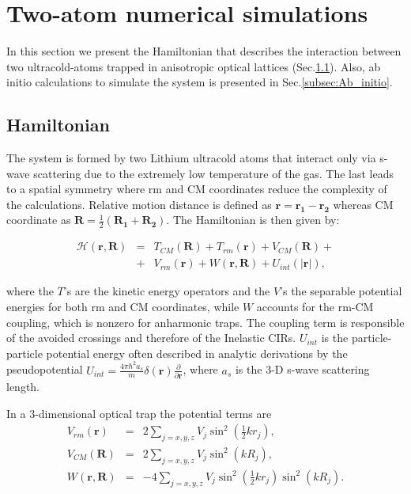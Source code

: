 \documentclass[aps,pre,twocolumn,superscriptaddress,showpacs]{revtex4-1}
\newcommand{\bfeq}[1]{{\boldsymbol{#1}}}
\begin{document}
\section{Two-atom numerical simulations}  \label{sec:system}
	In this section we present the Hamiltonian that describes the interaction between two ultracold-atoms trapped in anisotropic optical lattices (Sec.\ref{subsec:H}). Also, ab initio 	calculations to simulate the system is presented in Sec.\ref{subsec:Ab_initio}.
	\subsection{Hamiltonian} \label{subsec:H}
		The system is formed by two Lithium ultracold atoms that interact only via s-wave scattering due to the extremely low temperature of the gas. The 		last 	leads to a spatial symmetry where rm and CM coordinates reduce the complexity of the calculations. Relative motion distance is defined as		$\bfeq{r} = \bfeq{r_1} - \bfeq{r_2}$ whereas CM coordinate as $\bfeq{R} = \frac{1}{2}(\bfeq{R_1} + \bfeq{R_2})$. The Hamiltonian is then given 			by:
		
		\begin{eqnarray}
			\mathcal{H}(\bfeq{r}, \bfeq{R}) &=& T_{CM}(\bfeq{R}) + T_{rm}(\bfeq{r}) + V_{CM}(\bfeq{R}) + 				\nonumber \\ 
			 &+& V_{rm}(\bfeq{r}) + W(\bfeq{r}, \bfeq{R}) + U_{int}(|\bfeq{r}|), 
			 \label{eq:Hamiltonian}
		\end{eqnarray}
		
		where the $T$'s are the kinetic energy operators and the $V$'s the separable potential energies for both rm and CM coordinates, while $W$ 		accounts for the rm-CM coupling, which is nonzero for anharmonic traps. The coupling term is responsible of 			the avoided crossings and therefore of the Inelastic CIRs. $U_{int}$ is the particle-particle potential energy often described in analytic derivations by 		the pseudopotential $U_{int} = \frac{4\pi \hbar^2 a_s}{m} \delta(\bfeq{r})\frac{\partial}{\partial \bfeq{r}}$, where $a_s$ is the 3-D s-wave scattering length.
		
		In a 3-dimensional optical trap the potential terms are
		\begin{eqnarray}
			V_{rm}(\bfeq{r}) &=& 2 \sum_{j=x,y,z} V_j \sin^2 \left(\frac{1}{2}k r_j \right), \\
			V_{CM}(\bfeq{R}) &=& 2 \sum_{j=x,y,z} V_j \sin^2 \left(k R_j \right), \\
			W(\bfeq{r}, \bfeq{R}) &=& -4 \sum_{j=x,y,z} V_j \sin^2 \left(\frac{1}{2}k r_j \right) \sin^2 \left(k R_j \right).
		\end{eqnarray}
		
\end{document}
